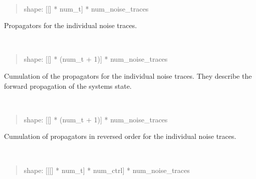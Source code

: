 \documentclass[letterpaper,10pt,english]{sphinxmanual}
\begin{document}
\begin{fulllineitems}
\begin{fulllineitems}
\end{fulllineitems}



\begin{fulllineitems}
~\begin{quote}

shape: {[}{[}{]} * num\_t{]} * num\_noise\_traces
\end{quote}

Propagators for the individual noise traces.

\end{fulllineitems}



\begin{fulllineitems}
~\begin{quote}

shape: {[}{[}{]} * (num\_t + 1){]} * num\_noise\_traces
\end{quote}

Cumulation of the propagators for the individual noise traces. They
describe the forward propagation of the systems state.

\end{fulllineitems}



\begin{fulllineitems}
~\begin{quote}

shape: {[}{[}{]} * (num\_t + 1){]} * num\_noise\_traces
\end{quote}

Cumulation of propagators in reversed order for the individual noise
traces.

\end{fulllineitems}



\begin{fulllineitems}
~\begin{quote}

shape: {[}{[}{[}{]} * num\_t{]} * num\_ctrl{]} * num\_noise\_traces
\end{quote}


\end{fulllineitems}
\end{fulllineitems}
\end{document}
